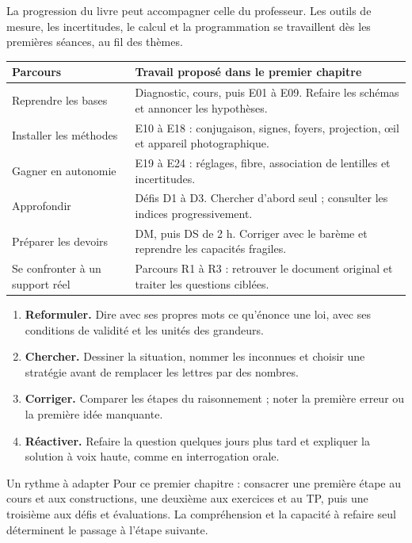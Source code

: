 \thispagestyle{mpsiFront}
La progression du livre peut accompagner celle du professeur. Les outils de mesure, les incertitudes, le calcul et la programmation se travaillent dès les premières séances, au fil des thèmes.
\begingroup\renewcommand{\arraystretch}{1.28}
\begin{tabularx}{\linewidth}{@{}p{35mm}Y@{}}
\toprule
Parcours & Travail proposé dans le premier chapitre\\\midrule
Reprendre les bases & Diagnostic, cours, puis E01 à E09. Refaire les schémas et annoncer les hypothèses.\\[2mm]
Installer les méthodes & E10 à E18 : conjugaison, signes, foyers, projection, œil et appareil photographique.\\[2mm]
Gagner en autonomie & E19 à E24 : réglages, fibre, association de lentilles et incertitudes.\\[2mm]
Approfondir & Défis D1 à D3. Chercher d'abord seul ; consulter les indices progressivement.\\[2mm]
Préparer les devoirs & DM, puis DS de 2 h. Corriger avec le barème et reprendre les capacités fragiles.\\[2mm]
Se confronter à un support réel & Parcours R1 à R3 : retrouver le document original et traiter les questions ciblées.\\
\bottomrule
\end{tabularx}\endgroup
{}
\begin{enumerate}
\item \textbf{Reformuler.} Dire avec ses propres mots ce qu'énonce une loi, avec ses conditions de validité et les unités des grandeurs.
\item \textbf{Chercher.} Dessiner la situation, nommer les inconnues et choisir une stratégie avant de remplacer les lettres par des nombres.
\item \textbf{Corriger.} Comparer les étapes du raisonnement ; noter la première erreur ou la première idée manquante.
\item \textbf{Réactiver.} Refaire la question quelques jours plus tard et expliquer la solution à voix haute, comme en interrogation orale.
\end{enumerate}
\begin{methode}{Un rythme à adapter}
Pour ce premier chapitre : consacrer une première étape au cours et aux constructions, une deuxième aux exercices et au TP, puis une troisième aux défis et évaluations. La compréhension et la capacité à refaire seul déterminent le passage à l'étape suivante.
\end{methode}
